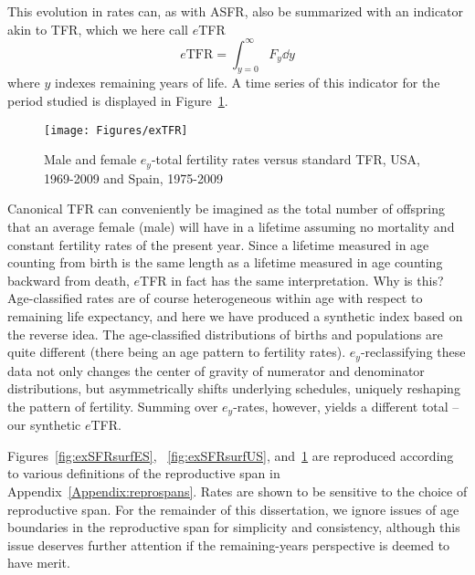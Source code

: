  \FloatBarrier
 \label{sec:etfr}
This evolution in rates can, as with ASFR, also be
summarized with an indicator akin to TFR, which we here call $e$TFR
\begin{equation}
\label{eq:exTFR}
e\mathrm{TFR} = \int _{y=0}^\infty F_y \dd y
\end{equation}
where $y$ indexes remaining years of life. A time series of this indicator
for the period studied is displayed in Figure~\ref{fig:exTFR}.

\begin{figure}[ht!]
        \centering  
          \caption{Male and female $e_y$-total fertility rates versus standard
          TFR, USA, 1969-2009 and Spain, 1975-2009}
           \texttt{[image: Figures/exTFR]}
          \label{fig:exTFR}
\end{figure}

Canonical TFR can conveniently be imagined as the total number of
offspring that an average female (male) will have in a lifetime assuming
no mortality and constant fertility rates of the present year.
Since a lifetime measured in age counting from birth is the same length as a
lifetime measured in age counting backward from death, $e$TFR in fact has the
same interpretation. Why is this? Age-classified rates are of course
heterogeneous within age with respect to remaining life expectancy, and here we
have produced a synthetic index based on the reverse idea. The age-classified
distributions of births and populations are quite different (there being an age
pattern to fertility rates). $e_y$-reclassifying these data not only changes the
center of gravity of numerator and denominator distributions, but asymmetrically
shifts underlying schedules, uniquely reshaping the pattern of
fertility. Summing over $e_y$-rates, however, yields a different total -- our
synthetic $e$TFR. 

Figures~\ref{fig:exSFRsurfES}, ~\ref{fig:exSFRsurfUS}, and~\ref{fig:exTFR} are
reproduced according to various definitions of the reproductive span in
Appendix~\ref{Appendix:reprospans}. Rates are shown to be sensitive to the
choice of reproductive span. For the remainder of this dissertation, we ignore
issues of age boundaries in the reproductive span for simplicity and
consistency, although this issue deserves further attention if the
remaining-years perspective is deemed to have merit.

\FloatBarrier